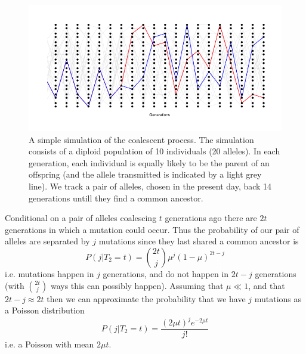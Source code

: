 \begin{figure}
\begin{center}
\includegraphics[width=\textwidth]{figures/Coalescent.png}
\end{center}
\caption{A simple simulation of the coalescent process. The simulation
  consists of a diploid population of 10 individuals (20 alleles). In
  each generation, each individual is equally likely to be the parent
  of an offspring (and the allele transmitted is indicated by a light
  grey line).  We track a
  pair of alleles, chosen in the present day, back 14 generations
  untill they find a common ancestor.} \label{fig:Coalescent_simulation}
\end{figure}



Conditional on a pair of alleles coalescing $t$ generations ago
there are $2t$ generations in which a mutation could occur. Thus the
probability of our pair of alleles are separated by $j$ mutations
since they last shared a common ancestor is
\begin{equation}
P(j | T_2 = t ) = {2t \choose j} \mu^{j} (1-\mu)^{2t-j}
\end{equation}
i.e. mutations happen in $j$ generations, and do not happen in $2t-j$
generations (with ${2t \choose j}$ ways this can possibly
happen). Assuming that $\mu \ll 1$, and that $2t-j \approx 2t$ then we
can approximate the probability that we have $j$ mutations as a
Poisson distribution
\begin{equation}
P(j | T_2 = t ) = \frac{ (2 \mu t )^{j} e^{-2\mu t}}{j!}
\end{equation}
i.e. a Poisson with mean $2\mu t $. \\

